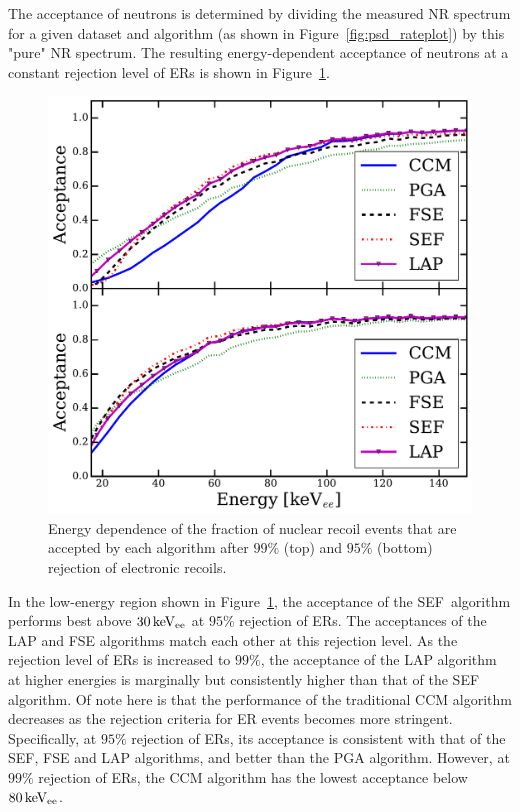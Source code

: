 The acceptance of neutrons is determined by dividing the measured NR spectrum for a given dataset and algorithm (as shown in Figure~\ref{fig:psd_rateplot}) by this "pure" NR spectrum. The resulting energy-dependent acceptance of neutrons at a constant rejection level of ERs is shown in Figure~\ref{fig:psd_acceptance}.

\begin{figure}[htb]
\centering
    \includegraphics[width = \textwidth]{figures/psd/fig_acceptance}
    \caption{Energy dependence of the fraction of nuclear recoil events that are accepted by each algorithm after $99\%$ (top) and $95\%$ (bottom) rejection of electronic recoils.}\label{fig:psd_acceptance}
\end{figure}

In the low-energy region shown in Figure~\ref{fig:psd_acceptance}, the acceptance of the SEF~algorithm performs best above $30\,\mathrm{keV_{ee}}$ at $95\%$ rejection of ERs. The acceptances of the LAP and FSE algorithms match each other at this rejection level. As the rejection level of ERs is increased to $99\%$, the acceptance of the LAP algorithm at higher energies is marginally but consistently higher than that of the SEF algorithm. Of note here is that the performance of the traditional CCM algorithm decreases as the rejection criteria for ER events becomes more stringent. Specifically, at $95\%$ rejection of ERs, its acceptance is consistent with that of the SEF, FSE and LAP algorithms, and better than the PGA algorithm. However, at $99\%$ rejection of ERs, the CCM algorithm has the lowest acceptance below $80\,\mathrm{keV_{ee}}$.

